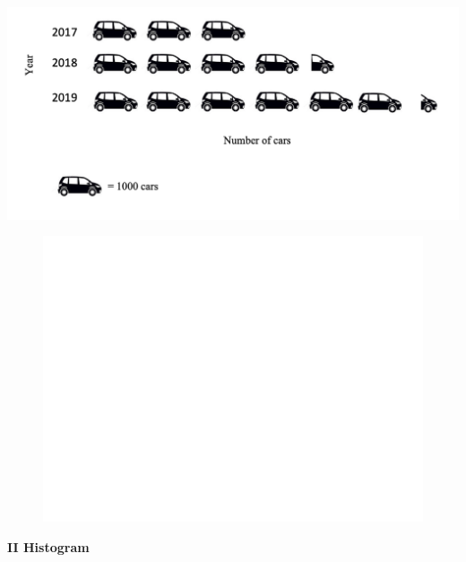 \documentclass[]{book}
\begin{document}
\begin{center}\includegraphics[width=1\linewidth]{figure/pictogram} \end{center}

\begin{figure}

{\centering \includegraphics[width=1\linewidth]{figure/box16-1} 

}

\end{figure}

\textbf{II Histogram}
\end{document}

